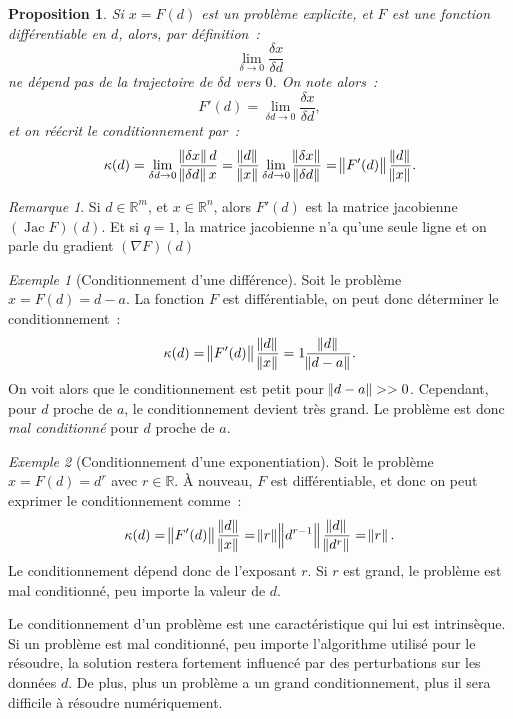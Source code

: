 \documentclass{article}
\newtheorem{prp}[thm]{Proposition}
\theoremstyle{definition}
\theoremstyle{remark}
\newtheorem*{rmq}{Remarque}
\newtheorem{ex}{Exemple}
\DeclareMathOperator{\Jac}{Jac}
\newcommand{\R}{\mathbb R}
\begin{document}
	\begin{prp} Si $x = F(d)$ est un problème explicite, et $F$ est une fonction différentiable en $d$, alors, par définition~:
	\[\lim_{\delta \to 0}\frac {\delta x}{\delta d}\]
	ne dépend pas de la trajectoire de $\delta d$ vers $0$. On note alors~:
	\[F'(d) = \lim_{\delta d \to 0}\frac {\delta x}{\delta d},\]
	et on réécrit le conditionnement par~:
	\[\kappa(d) = \lim_{\delta d \to 0}\frac {\norm {\delta x}d}{\norm {\delta d}x}
	= \frac {\norm d}{\norm x}\lim_{\delta d \to 0}\frac {\norm {\delta x}}{\norm {\delta d}} = \norm {F'(d)}\frac {\norm  d}{\norm x}.\]
	\end{prp}

	\begin{rmq} Si $d \in \R^m$, et $x \in \R^n$, alors $F'(d)$ est la matrice jacobienne $(\Jac F)(d)$. Et si $q = 1$, la matrice jacobienne n'a qu'une seule
	ligne et on parle du gradient $(\nabla F)(d)$
	\end{rmq}

	\begin{ex}[Conditionnement d'une différence] Soit le problème $x = F(d) = d-a$. La fonction $F$ est différentiable, on peut donc déterminer le
	conditionnement~:
	\[\kappa(d) = \norm {F'(d)}\frac {\norm d}{\norm x} = 1\frac {\norm d}{\norm {d-a}}.\]
	On voit alors que le conditionnement est petit pour $\norm {d-a} >> 0$. Cependant, pour $d$ proche de $a$, le conditionnement devient très grand.
	Le problème est donc \emph{mal conditionné} pour $d$ proche de $a$.
	\end{ex}

	\begin{ex}[Conditionnement d'une exponentiation] Soit le problème $x = F(d) = d^r$ avec $r \in \R$. À nouveau, $F$ est différentiable, et donc on peut
	exprimer le conditionnement comme~:
	\[\kappa(d) = \norm {F'(d)}\frac {\norm d}{\norm x} = \norm r\norm {d^{r-1}}\frac {\norm d}{\norm {d^r}} = \norm r.\]
	Le conditionnement dépend donc de l'exposant $r$. Si $r$ est grand, le problème est mal conditionné, peu importe la valeur de $d$.
	\end{ex}

	Le conditionnement d'un problème est une caractéristique qui lui est intrinsèque. Si un problème est mal conditionné, peu importe l'algorithme utilisé pour
	le résoudre, la solution restera fortement influencé par des perturbations sur les données $d$. De plus, plus un problème a un grand conditionnement, plus
	il sera difficile à résoudre numériquement.
\end{document}
